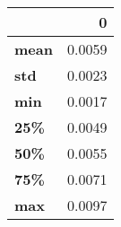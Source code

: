 \begin{tabular}{lr}
\toprule
{} &       0 \\
\midrule
\textbf{mean} &  0.0059 \\
\textbf{std } &  0.0023 \\
\textbf{min } &  0.0017 \\
\textbf{25\% } &  0.0049 \\
\textbf{50\% } &  0.0055 \\
\textbf{75\% } &  0.0071 \\
\textbf{max } &  0.0097 \\
\bottomrule
\end{tabular}
